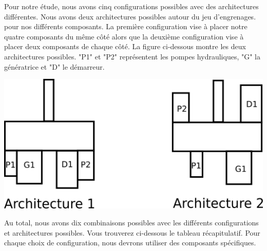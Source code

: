 \documentclass{config}
\begin{document}
\begin{spacing}{1.2}
Pour notre étude, nous avons cinq configurations possibles avec des architectures différentes. Nous avons deux architectures possibles autour du jeu d'engrenages. pour nos différents composants. La première configuration vise à placer notre quatre composants du même côté alors que la deuxième configuration vise à placer deux composants de chaque côté.
La figure ci-dessous montre les deux architectures possibles. "P1" et "P2" représentent les pompes hydrauliques, "G" la génératrice et "D" le démarreur. 

\begin{center}
\includegraphics[scale=0.4]{architecture_BE.png}
\end{center}

Au total, nous avons dix combinaisons possibles avec les différents configurations et architectures possibles. Vous trouverez ci-dessous le tableau récapitulatif. Pour chaque choix de configuration, nous devrons utiliser des composants spécifiques.

\begin{table}[h]
\centering
{}
\end{table}


\end{spacing}
\end{document}
